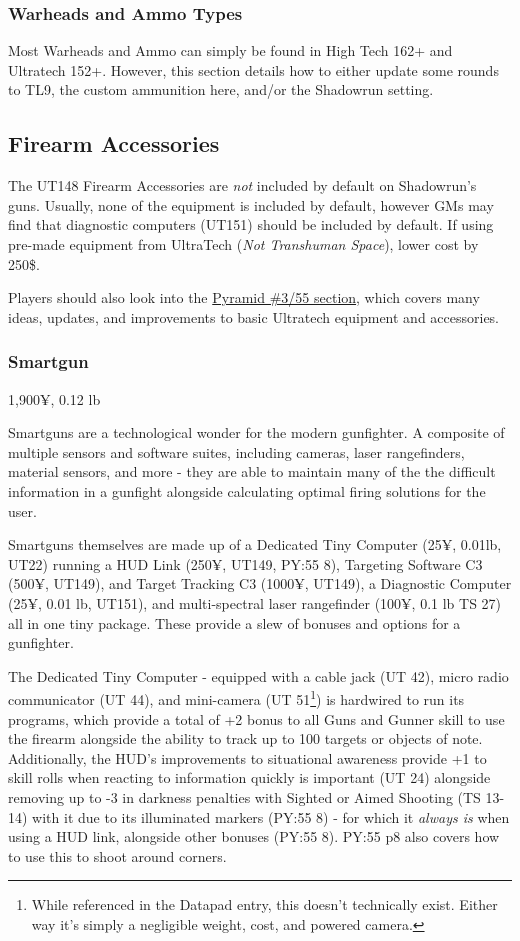 \subsubsection{Warheads and Ammo Types}

Most Warheads and Ammo can simply be found in High Tech 162+ and Ultratech 152+. However, this section details how to either update some rounds to TL9, the custom ammunition here, and/or the Shadowrun setting.

\subsection{Firearm Accessories}
The UT148 Firearm Accessories are \textit{not} included by default on Shadowrun's guns. Usually, none of the equipment is included by default, however GMs may find that diagnostic computers (UT151) should be included by default. If using pre-made equipment from UltraTech (\textit{Not Transhuman Space}), lower cost by 250\$.

Players should also look into the \hyperref[3/55]{Pyramid \#3/55 section}, which covers many ideas, updates, and improvements to basic Ultratech equipment and accessories.

\subsubsection{Smartgun}\label{smartgun}
1,900¥, 0.12 lb

Smartguns are a technological wonder for the modern gunfighter. A composite of multiple sensors and software suites, including cameras, laser rangefinders, material sensors, and more - they are able to maintain many of the the difficult information in a gunfight alongside calculating optimal firing solutions for the user.

Smartguns themselves are made up of a Dedicated Tiny Computer (25¥, 0.01lb, UT22) running a HUD Link (250¥, UT149, PY:55 8), Targeting Software C3 (500¥, UT149), and Target Tracking C3 (1000¥, UT149), a Diagnostic Computer (25¥, 0.01 lb, UT151), and multi-spectral laser rangefinder (100¥, 0.1 lb TS 27) all in one tiny package. These provide a slew of bonuses and options for a gunfighter. 

The Dedicated Tiny Computer - equipped with a cable jack (UT 42), micro radio communicator (UT 44), and mini-camera (UT 51\footnote{While referenced in the Datapad entry, this doesn't technically exist. Either way it's simply a negligible weight, cost, and powered camera.}) is hardwired to run its programs, which provide a total of +2 bonus to all Guns and Gunner skill to use the firearm alongside the ability to track up to 100 targets or objects of note. Additionally, the HUD's improvements to situational awareness provide +1 to skill rolls when reacting to information quickly is important (UT 24) alongside removing up to -3 in darkness penalties with Sighted or Aimed Shooting (TS 13-14) with it due to its illuminated markers (PY:55 8) - for which it \textit{always is} when using a HUD link, alongside other bonuses (PY:55 8). PY:55 p8 also covers how to use this to shoot around corners.

